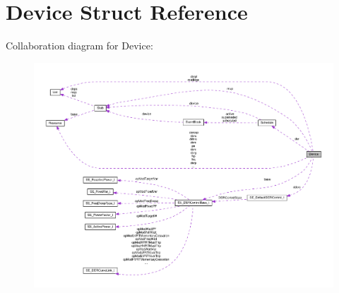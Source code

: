 \hypertarget{structDevice}{}\section{Device Struct Reference}
\label{structDevice}


Collaboration diagram for Device\+:
\nopagebreak
\begin{figure}[H]
\begin{center}
\leavevmode
\includegraphics[width=350pt]{structDevice__coll__graph}
\end{center}
\end{figure}
